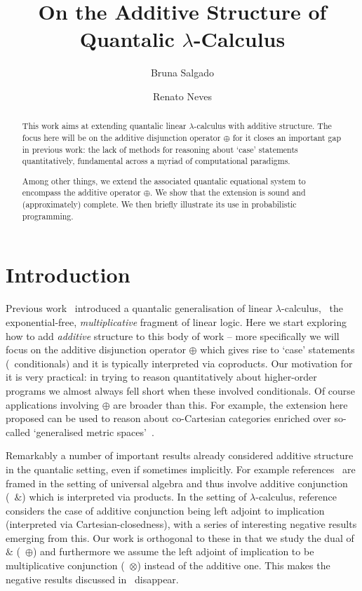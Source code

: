 \documentclass[a4paper,UKenglish,cleveref, autoref, thm-restate]{lipics-v2021}
\title{On the Additive Structure of Quantalic $\lambda$-Calculus} %
\author{Bruna Salgado}{University of Minho and INESC-TEC, Portugal }{johnqpublic@dummyuni.org}{https://orcid.org/0000-0002-1825-0097}{}%
\author{Renato Neves}{University of Minho and INESC-TEC, Portugal}{nevrenato@di.uminho.pt}{https://orcid.org/0000-0002-8787-2551}{}
\begin{document}
\maketitle

\begin{abstract}

This work aims at extending quantalic linear $\lambda$-calculus with additive
structure. The focus here will be on the additive disjunction operator $\oplus$
for it closes an important gap in previous work: the lack of methods for
reasoning about `case' statements  quantitatively, fundamental across a myriad
of computational paradigms. 

Among other things, we extend the associated quantalic equational system to
encompass the additive operator $\oplus$. We show that the extension is sound
and (approximately) complete. We then briefly illustrate its use in
probabilistic programming.

\end{abstract}

\section{Introduction}
\label{sec:intro}

Previous work~\cite{dahlqvist22,dahlqvist2023syntactic} introduced a quantalic
generalisation of linear $\lambda$-calculus, \ie\ the exponential-free,
\emph{multiplicative} fragment of linear logic. Here we start exploring how to
add \emph{additive} structure to this body of work -- more specifically we will
focus on the additive disjunction operator $\oplus$ which gives rise to `case'
statements (\ie\ conditionals) and it is typically interpreted via coproducts.
Our motivation for it is very practical: in trying to reason quantitatively
about higher-order programs we almost always fell short when these involved
conditionals. Of course applications involving $\oplus$ are broader than this. For
example, the extension here proposed can be used to reason about co-Cartesian
categories enriched over so-called `generalised metric spaces'~\cite{paseka00}.

Remarkably a number of important results already considered additive structure
in the quantalic setting, even if sometimes implicitly. For example
references~\cite{mardare2016quantitative,mardare2017axiomatizability,mio24,jurka24}
are framed in the setting of universal algebra and thus involve additive
conjunction (\ie\ $\&$) which is interpreted via products. In the setting of
$\lambda$-calculus, reference~\cite{lago22} considers the case of additive
conjunction being left adjoint to implication (interpreted via
Cartesian-closedness), with a series of interesting negative results emerging
from this.  Our work is orthogonal to these in that we study the dual of $\&$
(\ie\ $\oplus$) and furthermore we assume the left adjoint of implication
to be multiplicative conjunction (\ie\ $\otimes$) instead of the additive one. This
makes the negative results discussed in~\cite{lago22} disappear.
\end{document}
